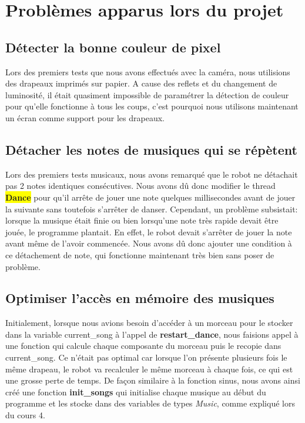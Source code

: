 \documentclass{article}
\begin{document}
    \section{Problèmes apparus lors du projet}
    
    \subsection{Détecter la bonne couleur de pixel}
    \label{problème_couleurs}
    Lors des premiers tests que nous avons effectués avec la caméra, nous utilisions des drapeaux imprimés sur papier. 
    A cause des reflets et du changement de luminosité, il était quasiment impossible de paramétrer la détection de couleur pour qu'elle fonctionne à tous les coups, c'est pourquoi nous utilisons maintenant un écran comme support pour les drapeaux.
    
    \subsection{Détacher les notes de musiques qui se répètent}
    Lors des premiers tests musicaux, nous avons remarqué que le robot ne détachait pas 2 notes identiques consécutives. Nous avons dû donc modifier le thread \colorbox{yellow}{\textbf{Dance}} pour qu'il arrête de jouer une note quelques millisecondes avant de jouer la suivante sans toutefois s'arrêter de danser. Cependant, un problème subsistait: lorsque la musique était finie ou bien lorsqu'une note très rapide devait être jouée, le programme plantait. En effet, le robot devait s'arrêter de jouer la note avant même de l'avoir commencée. Nous avons dû donc ajouter une condition à ce détachement de note, qui fonctionne maintenant très bien sans poser de problème.
    
    \subsection{Optimiser l'accès en mémoire des musiques}
    Initialement, lorsque nous avions besoin d'accéder à un morceau pour le stocker dans la variable \textcolor{bleu}{current\_song} à l'appel de \textbf{restart\_dance}, nous faisions appel à une fonction qui calcule chaque composante du morceau puis le recopie dans \textcolor{bleu}{current\_song}. 
    Ce n'était pas optimal car lorsque l'on présente plusieurs fois le même drapeau, le robot va recalculer le même morceau à chaque fois, ce qui est une grosse perte de temps. 
    De façon similaire à la fonction sinus, nous avons ainsi créé une fonction \textbf{init\_songs} qui initialise chaque musique au début du programme et les stocke dans des variables de types \textit{Music}, comme expliqué lors du cours 4. \cite{sinus}
   
\end{document}
